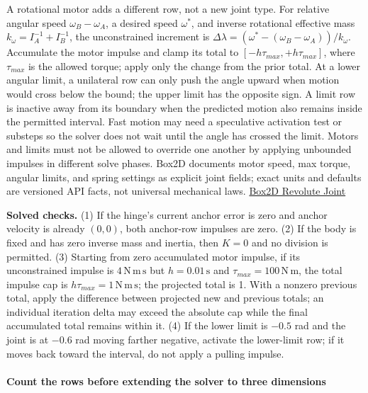 A rotational motor adds a different row, not a new joint type. For relative angular speed \(\omega_B-\omega_A\), a desired speed \(\omega^*\), and inverse rotational effective mass \(k_\omega=I_A^{-1}+I_B^{-1}\), the unconstrained increment is \(\Delta\lambda=(\omega^*-(\omega_B-\omega_A))/k_\omega\). Accumulate the motor impulse and clamp its total to \([-h\tau_{max},+h\tau_{max}]\), where \(\tau_{max}\) is the allowed torque; apply only the change from the prior total. At a lower angular limit, a unilateral row can only push the angle upward when motion would cross below the bound; the upper limit has the opposite sign. A limit row is inactive away from its boundary when the predicted motion also remains inside the permitted interval. Fast motion may need a speculative activation test or substeps so the solver does not wait until the angle has crossed the limit. Motors and limits must not be allowed to override one another by applying unbounded impulses in different solve phases. Box2D documents motor speed, max torque, angular limits, and spring settings as explicit joint fields; exact units and defaults are versioned API facts, not universal mechanical laws. \href{https://box2d.org/documentation/group__revolute__joint.html}{Box2D Revolute Joint}

\textbf{Solved checks.} (1) If the hinge's current anchor error is zero and anchor velocity is already \((0,0)\), both anchor-row impulses are zero. (2) If the body is fixed and has zero inverse mass and inertia, then \(K=0\) and no division is permitted. (3) Starting from zero accumulated motor impulse, if its unconstrained impulse is \(4\,\mathrm{N\,m\,s}\) but \(h=0.01\,\mathrm s\) and \(\tau_{max}=100\,\mathrm{N\,m}\), the total impulse cap is \(h\tau_{max}=1\,\mathrm{N\,m\,s}\); the projected total is 1. With a nonzero previous total, apply the difference between projected new and previous totals; an individual iteration delta may exceed the absolute cap while the final accumulated total remains within it. (4) If the lower limit is \(-0.5\) rad and the joint is at \(-0.6\) rad moving farther negative, activate the lower-limit row; if it moves back toward the interval, do not apply a pulling impulse.

\paragraph{Count the rows before extending the solver to three dimensions}\label{06-engine-ii-ch033-count-the-rows-before-extending-the-solver-to-three-dimensions}

